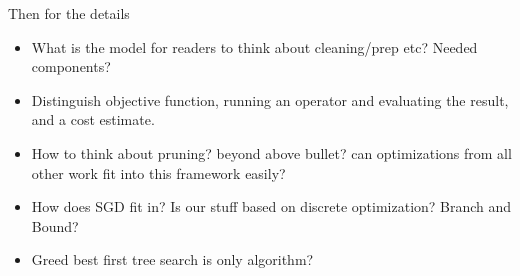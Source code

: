 Then for the details

\begin{itemize}
  \item What is the model for readers to think about cleaning/prep etc?  Needed components?
  \item Distinguish objective function, running an operator and evaluating the result, and a cost estimate.
  \item How to think about pruning? beyond above bullet?  can optimizations from all other work fit into this framework easily?
  \item How does SGD fit in?  Is our stuff based on discrete optimization?  Branch and Bound?
  \item Greed best first tree search is only algorithm?  

\end{itemize}
\fi











